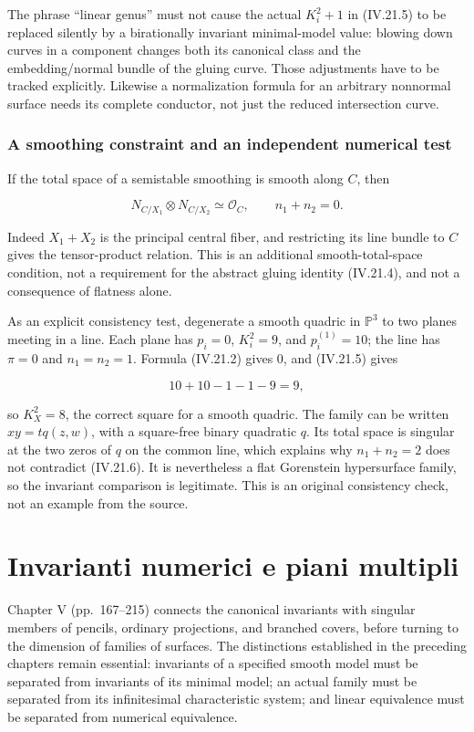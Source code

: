 The phrase ``linear genus'' must not cause the actual \(K_i^2+1\) in (IV.21.5) to be replaced silently by a birationally invariant minimal-model value: blowing down curves in a component changes both its canonical class and the embedding/normal bundle of the gluing curve. Those adjustments have to be tracked explicitly. Likewise a normalization formula for an arbitrary nonnormal surface needs its complete conductor, not just the reduced intersection curve.

\subsection{A smoothing constraint and an independent numerical test}

If the total space of a semistable smoothing is smooth along \(C\), then

\[
N_{C/X_1}\otimes N_{C/X_2}\simeq\mathcal O_C,
\qquad n_1+n_2=0.
\tag{IV.21.6}
\]

Indeed \(X_1+X_2\) is the principal central fiber, and restricting its line bundle to \(C\) gives the tensor-product relation. This is an additional smooth-total-space condition, not a requirement for the abstract gluing identity (IV.21.4), and not a consequence of flatness alone.

As an explicit consistency test, degenerate a smooth quadric in \(\mathbb P^3\) to two planes meeting in a line. Each plane has \(p_i=0\), \(K_i^2=9\), and \(p_i^{(1)}=10\); the line has \(\pi=0\) and \(n_1=n_2=1\). Formula (IV.21.2) gives 0, and (IV.21.5) gives

\[
10+10-1-1-9=9,
\]

so \(K_X^2=8\), the correct square for a smooth quadric. The family can be written \(xy=tq(z,w)\), with a square-free binary quadratic \(q\). Its total space is singular at the two zeros of \(q\) on the common line, which explains why \(n_1+n_2=2\) does not contradict (IV.21.6). It is nevertheless a flat Gorenstein hypersurface family, so the invariant comparison is legitimate. This is an original consistency check, not an example from the source.

\chapter{Invarianti numerici e piani multipli}
\label{cp1-ch-v}

Chapter V (pp.~167--215) connects the canonical invariants with singular members of pencils, ordinary projections, and branched covers, before turning to the dimension of families of surfaces. The distinctions established in the preceding chapters remain essential: invariants of a specified smooth model must be separated from invariants of its minimal model; an actual family must be separated from its infinitesimal characteristic system; and linear equivalence must be separated from numerical equivalence.

